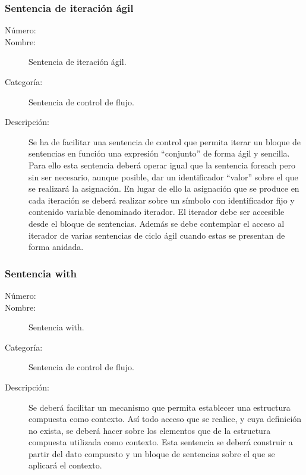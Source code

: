 
\subsubsection{Sentencia de iteración ágil}
	\begin{description}
		\item [Número:] \cn
		\item [Nombre:] Sentencia de iteración ágil.
		\item [Categoría:] Sentencia de control de flujo.
		\item [Descripción:] Se ha de facilitar una sentencia de control que permita
		iterar un bloque de sentencias en función una expresión ``conjunto'' de forma ágil y sencilla.
		Para ello esta sentencia deberá operar igual que la sentencia foreach pero sin ser necesario, aunque posible,
		dar un identificador ``valor'' sobre el que se realizará la asignación. En lugar de ello la asignación que se produce
		en cada iteración se deberá realizar sobre un símbolo con identificador fijo y contenido variable denominado iterador.
		El iterador debe ser accesible desde el bloque de sentencias. Además se debe contemplar el acceso al iterador de 
      varias sentencias de ciclo ágil cuando estas se presentan de forma anidada. 
	\end {description}

\subsubsection{Sentencia with}
	\begin{description}
		\item [Número:] \cn
		\item [Nombre:] Sentencia with.
		\item [Categoría:] Sentencia de control de flujo.
		\item [Descripción:] Se deberá facilitar un mecanismo que permita establecer una estructura compuesta como contexto. Así todo acceso que se
      realice, y cuya definición no exista, se deberá hacer sobre los elementos que de la estructura compuesta utilizada como contexto. 
      Esta sentencia se deberá construir a partir del dato compuesto y un bloque de sentencias sobre el que se aplicará el contexto.
	\end{description}

